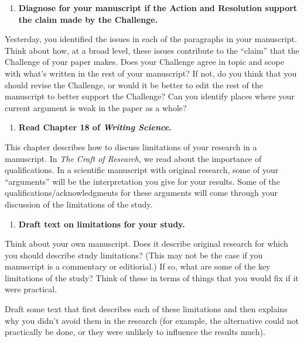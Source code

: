 \documentclass[]{tufte-book}
\providecommand{\tightlist}{%
  \setlength{\itemsep}{0pt}\setlength{\parskip}{0pt}}
\begin{document}
\begin{enumerate}
\def\labelenumi{\arabic{enumi}.}
\setcounter{enumi}{11}
\tightlist
\item
  \textbf{Diagnose for your manuscript if the Action and Resolution support the claim made by the Challenge.}
\end{enumerate}

Yesterday, you identified the issues in each of the paragraphs in your
manuscript. Think about how, at a broad level, these issues contribute to the
``claim'' that the Challenge of your paper makes. Does your Challenge agree in
topic and scope with what's written in the rest of your manuscript? If not, do
you think that you should revise the Challenge, or would it be better to edit
the rest of the manuscript to better support the Challenge? Can you identify
places where your current argument is weak in the paper as a whole?

\begin{enumerate}
\def\labelenumi{\arabic{enumi}.}
\setcounter{enumi}{12}
\tightlist
\item
  \textbf{Read Chapter 18 of \emph{Writing Science}.}
\end{enumerate}

This chapter describes how to discuss limitations of your research in a
manuscript. In \emph{The Craft of Research}, we read about the importance of
qualifications. In a scientific manuscript with original research, some of your
``arguments'' will be the interpretation you give for your results. Some of the
qualifications/acknowledgments for these arguments will come through your
discussion of the limitations of the study.

\begin{enumerate}
\def\labelenumi{\arabic{enumi}.}
\setcounter{enumi}{13}
\tightlist
\item
  \textbf{Draft text on limitations for your study.}
\end{enumerate}

Think about your own manuscript. Does it describe original research for which
you should describe study limitations? (This may not be the case if you
manuscript is a commentary or editiorial.) If so, what are some of the key
limitations of the study? Think of these in terms of things that you would fix
if it were practical.

Draft some text that first describes each of these limitations and then explains
why you didn't avoid them in the research (for example, the alternative could
not practically be done, or they were unlikely to influence the results much).
\end{document}
